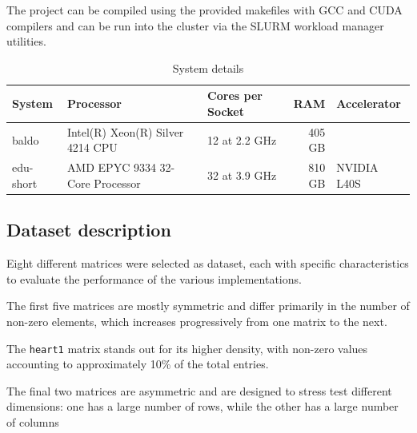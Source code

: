 \documentclass[conference]{IEEEtran}
\begin{document}
        The project can be compiled using the provided makefiles with GCC and
        CUDA compilers and can be run into the cluster via the SLURM workload
        manager utilities.

        \begin{table}[ht]
            \caption{System details}
            \label{tab:system_description}
            \centering
            \begin{adjustbox}{width=\columnwidth}
            \begin{tabular}{lllrl}
            \toprule
            \textbf{System} &  \textbf{Processor} & \textbf{Cores per Socket} & \textbf{RAM} & \textbf{Accelerator} \\
            \midrule
                baldo & Intel(R) Xeon(R) Silver 4214 CPU & 12 at 2.2 GHz & 405 GB & \\
                edu-short & AMD EPYC 9334 32-Core Processor & 32 at 3.9 GHz & 810 GB & NVIDIA L40S \\
            \bottomrule
            \end{tabular}
            \end{adjustbox}
        \end{table}

        \subsection{Dataset description}
        
        Eight different matrices were selected as dataset, each with specific
        characteristics to evaluate the performance of the various
        implementations.

        The first five matrices are mostly symmetric and differ primarily in
        the number of non-zero elements, which increases progressively from one
        matrix to the next.

        The \texttt{heart1} matrix stands out for its higher density, with non-zero
        values accounting to approximately 10\% of the total entries.

        The final two matrices are asymmetric and are designed to stress test
        different dimensions: one has a large number of rows, while the other
        has a large number of columns
\end{document}
